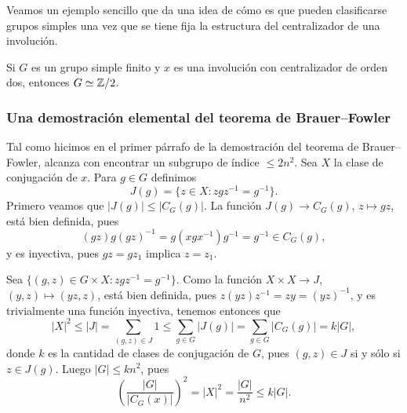 Veamos un ejemplo sencillo que da una idea de cómo es que pueden clasificarse grupos simples
una vez que se tiene fija la estructura del centralizador de una involución. 

\begin{exercise}
Si $G$ es un grupo simple finito y $x$ es una involución con centralizador de orden dos, entonces 
$G\simeq\mathbb{Z}/2$. 
\end{exercise}


\subsubsection*{Una demostración elemental del teorema de Brauer--Fowler}

Tal como hicimos en el primer párrafo de la demostración del teorema de Brauer--Fowler, alcanza con
encontrar un subgrupo de índice $\leq 2n^2$. 
Sea $X$ la clase de conjugación de $x$. Para $g\in G$ definimos
\[
J(g)=\{z\in X:zgz^{-1}=g^{-1}\}.
\]
Primero veamos que $|J(g)|\leq|C_G(g)|$. La función $J(g)\to C_G(g)$, $z\mapsto gz$, está bien definida, 
pues 
\[
(gz)g(gz)^{-1}=g(xgx^{-1})g^{-1}=g^{-1}\in C_G(g),
\]
y es inyectiva, pues $gz=gz_1$ implica $z=z_1$.

Sea $\{(g,z)\in G\times X:zgz^{-1}=g^{-1}\}$.  
Como la función $X\times X\to J$, $(y,z)\mapsto (yz,z)$, 
está bien definida, pues $z(yz)z^{-1}=zy=(yz)^{-1}$, y es trivialmente una función inyectiva, 
tenemos entonces que
\[
|X|^2\leq |J|=\sum_{(g,z)\in J}1\leq\sum_{g\in G}|J(g)|=\sum_{g\in G}|C_G(g)|=k|G|,
\]
donde $k$ es la cantidad de clases de conjugación de $G$, 
pues $(g,z)\in J$ si y sólo si $z\in J(g)$. Luego $|G|\leq kn^2$, pues
\[
\left(\frac{|G|}{|C_G(x)|}\right)^2=|X|^2=\frac{|G|}{n^2}\leq k|G|.
\]

